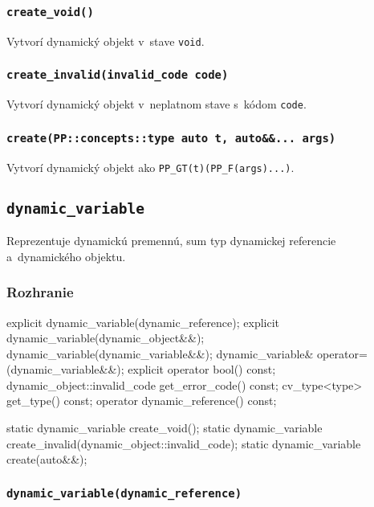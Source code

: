 \subsubsection{\texttt{create\_void()}}

Vytvorí dynamický objekt v~stave \texttt{void}.

\subsubsection{\texttt{create\_invalid(invalid\_code code)}}

Vytvorí dynamický objekt v~neplatnom stave s~kódom \texttt{code}.

\subsubsection{\texttt{create(PP::concepts::type auto t, auto\&\&... args)}}

Vytvorí dynamický objekt ako \texttt{PP\_GT(t)(PP\_F(args)...)}.

\subsection{\texttt{dynamic\_variable}}

Reprezentuje dynamickú premennú, sum typ dynamickej referencie a~dynamického objektu.

\subsubsection{Rozhranie}

\begin{code}[fontsize=\footnotesize]
explicit dynamic_variable(dynamic_reference);
explicit dynamic_variable(dynamic_object&&);
dynamic_variable(dynamic_variable&&);
dynamic_variable& operator=(dynamic_variable&&);
explicit operator bool() const;
dynamic_object::invalid_code get_error_code() const;
cv_type<type> get_type() const;
operator dynamic_reference() const;

static dynamic_variable create_void();
static dynamic_variable create_invalid(dynamic_object::invalid_code);
static dynamic_variable create(auto&&);
\end{code}

\subsubsection{\texttt{dynamic\_variable(dynamic\_reference)}}

